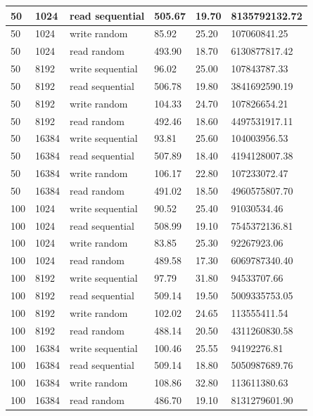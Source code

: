 \begin{tabularx}{\textwidth}{|X|X|X|X|X|X|}
    \hline
    50 & 1024 & read sequential & 505.67 & 19.70 & 8135792132.72 \\
    \hline
    50 & 1024 & write random & 85.92 & 25.20 & 107060841.25 \\
    \hline
    50 & 1024 & read random & 493.90 & 18.70 & 6130877817.42 \\
    \hline
    \hline
    \rowcolor{lightgray} 50 & 8192 & write sequential & 96.02 & 25.00 & 107843787.33 \\
    \hline
    \rowcolor{lightgray} 50 & 8192 & read sequential & 506.78 & 19.80 & 3841692590.19 \\
    \hline
    \rowcolor{lightgray} 50 & 8192 & write random & 104.33 & 24.70 & 107826654.21 \\
    \hline
    \rowcolor{lightgray} 50 & 8192 & read random & 492.46 & 18.60 & 4497531917.11 \\
    \hline
    \hline
    50 & 16384 & write sequential & 93.81 & 25.60 & 104003956.53 \\
    \hline
    50 & 16384 & read sequential & 507.89 & 18.40 & 4194128007.38 \\
    \hline
    50 & 16384 & write random & 106.17 & 22.80 & 107233072.47 \\
    \hline
    50 & 16384 & read random & 491.02 & 18.50 & 4960575807.70 \\
    \hline
    \hline
    \rowcolor{lightgray} 100 & 1024 & write sequential & 90.52 & 25.40 & 91030534.46 \\
    \hline
    \rowcolor{lightgray} 100 & 1024 & read sequential & 508.99 & 19.10 & 7545372136.81 \\
    \hline
    \rowcolor{lightgray} 100 & 1024 & write random & 83.85 & 25.30 & 92267923.06 \\
    \hline
    \rowcolor{lightgray} 100 & 1024 & read random & 489.58 & 17.30 & 6069787340.40 \\
    \hline
    \hline
    100 & 8192 & write sequential & 97.79 & 31.80 & 94533707.66 \\
    \hline
    100 & 8192 & read sequential & 509.14 & 19.50 & 5009335753.05 \\
    \hline
    100 & 8192 & write random & 102.02 & 24.65 & 113555411.54 \\
    \hline
    100 & 8192 & read random & 488.14 & 20.50 & 4311260830.58 \\
    \hline
    \hline
    \rowcolor{lightgray} 100 & 16384 & write sequential & 100.46 & 25.55 & 94192276.81 \\
    \hline
    \rowcolor{lightgray} 100 & 16384 & read sequential & 509.14 & 18.80 & 5050987689.76 \\
    \hline
    \rowcolor{lightgray} 100 & 16384 & write random & 108.86 & 32.80 & 113611380.63 \\
    \hline
    \rowcolor{lightgray} 100 & 16384 & read random & 486.70 & 19.10 & 8131279601.90 \\
    \hline
    \hline
    \end{tabularx}

